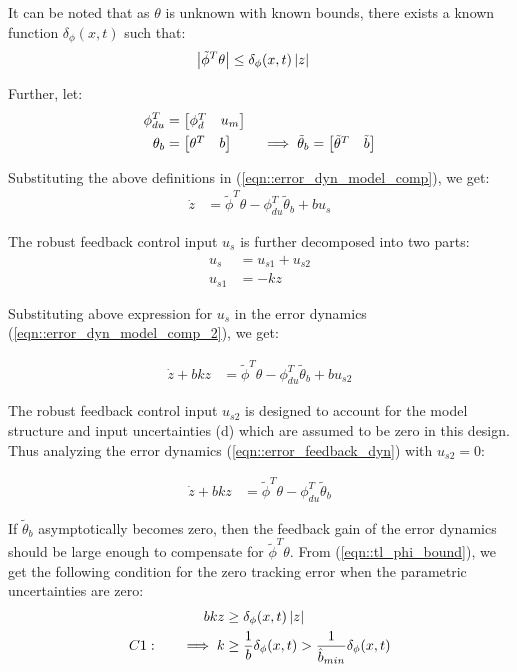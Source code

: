 It can be noted that as $\theta$ is unknown with known bounds, there exists a
known function $\delta_\phi(x, t)$ such that:
\begin{align}
    \left\lvert \tilde \phi^T \theta \right\rvert &\leq \delta_\phi(x, t) \left\lvert z \right\rvert
    \label{eqn::tl_phi_bound}
\end{align}


Further, let:
\begin{align}
    \phi_{du}^T &= \begin{bmatrix} \phi_d^T & u_m \end{bmatrix}\\
    \theta_{b} &= \begin{bmatrix} \theta^T & b \end{bmatrix} \qquad \implies \tilde \theta_b = \begin{bmatrix} \tilde \theta^T & \tilde b \end{bmatrix}
\end{align}

Substituting the above definitions in (\ref{eqn::error_dyn_model_comp}), we get:
\begin{align}
    \dot z &= \tilde \phi^T \theta - \phi_{du}^T \tilde \theta_b + bu_s
    \label{eqn::error_dyn_model_comp_2}
\end{align}

The robust feedback control input $u_s$ is further decomposed into two parts:
\begin{align}
    u_s &= u_{s1} + u_{s2}\\
    u_{s1} &= - k z
\end{align}

Substituting above expression for $u_s$ in the error dynamics
(\ref{eqn::error_dyn_model_comp_2}), we get:

\begin{align}
    \dot z + bk z &= \tilde \phi^T \theta - \phi_{du}^T \tilde \theta_b + bu_{s2}
    \label{eqn::error_feedback_dyn}
\end{align}

The robust feedback control input $u_{s2}$ is designed to account for the model
structure and input uncertainties (d) which are assumed to be zero in this
design. Thus analyzing the error dynamics (\ref{eqn::error_feedback_dyn}) with
$u_{s2} = 0$:

\begin{align*}
    \dot z + bk z &= \tilde \phi^T \theta - \phi_{du}^T \tilde \theta_b
\end{align*}

If $\tilde \theta_b$ asymptotically becomes zero, then the feedback gain of the
error dynamics should be large enough to compensate for $\tilde \phi^T \theta$.
From (\ref{eqn::tl_phi_bound}), we get the following condition for the zero
tracking error when the parametric uncertainties are zero:
\begin{align}
    bkz &\geq \delta_\phi(x, t) \left\lvert z \right\rvert\\
    C1: \qquad \implies k &\geq \frac{1}{b}\delta_\phi(x, t) > \frac{1}{\hat b_{min}} \delta_\phi(x, t)
    \label{eqn::k_bound}
\end{align}
